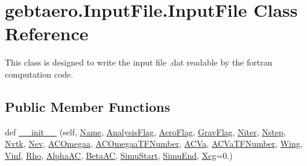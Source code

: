 \hypertarget{classgebtaero_1_1_input_file_1_1_input_file}{}\section{gebtaero.\+Input\+File.\+Input\+File Class Reference}
\label{classgebtaero_1_1_input_file_1_1_input_file}


This class is designed to write the input file .dat readable by the fortran computation code.  


\subsection*{Public Member Functions}
\begin{DoxyCompactItemize}
\item 
def \hyperlink{classgebtaero_1_1_input_file_1_1_input_file_ab2b0171273e5341d432bc98b59208afd}{\+\_\+\+\_\+init\+\_\+\+\_\+} (self, \hyperlink{classgebtaero_1_1_input_file_1_1_input_file_a87afcf626898dba8987e1cee7c4b4ed2}{Name}, \hyperlink{classgebtaero_1_1_input_file_1_1_input_file_a5e345411ff4b135151d46eaa96fd5b82}{Analysis\+Flag}, \hyperlink{classgebtaero_1_1_input_file_1_1_input_file_ad55254b6742bec2601372089bb1f96c4}{Aero\+Flag}, \hyperlink{classgebtaero_1_1_input_file_1_1_input_file_af8b6db9b44fda4dcd69858c0ae6675d2}{Grav\+Flag}, \hyperlink{classgebtaero_1_1_input_file_1_1_input_file_af663735f2e6dc4753c51e27ca4a7cbc6}{Niter}, \hyperlink{classgebtaero_1_1_input_file_1_1_input_file_af000cbafcaa45e8e55ad7e283f3fc10e}{Nstep}, \hyperlink{classgebtaero_1_1_input_file_1_1_input_file_a4cc370b4a5e05b66152449711685c0b8}{Nvtk}, \hyperlink{classgebtaero_1_1_input_file_1_1_input_file_ae7076931e907978fa63e151f549cc8ae}{Nev}, \hyperlink{classgebtaero_1_1_input_file_1_1_input_file_a17d270c516291f04138f9949ae9e6dd3}{A\+C\+Omegaa}, \hyperlink{classgebtaero_1_1_input_file_1_1_input_file_a6163d16b5322a7047dbe227ba5d390e0}{A\+C\+Omegaa\+T\+F\+Number}, \hyperlink{classgebtaero_1_1_input_file_1_1_input_file_af6abd7fc89c0f484e41fe96fc94e72ec}{A\+C\+Va}, \hyperlink{classgebtaero_1_1_input_file_1_1_input_file_adae1dff6c382e115473ad2b915854978}{A\+C\+Va\+T\+F\+Number}, \hyperlink{classgebtaero_1_1_wing_1_1_wing}{Wing}, \hyperlink{classgebtaero_1_1_input_file_1_1_input_file_aa219468b0f01af23063dbf55c5d40e1b}{Vinf}, \hyperlink{classgebtaero_1_1_input_file_1_1_input_file_a71105300fe8cf88253e38529768b998e}{Rho}, \hyperlink{classgebtaero_1_1_input_file_1_1_input_file_a1bf2ed2352dca0749990cccb737fef5a}{Alpha\+AC}, \hyperlink{classgebtaero_1_1_input_file_1_1_input_file_a20868cef3eeb8d6c140d62d2d2252657}{Beta\+AC}, \hyperlink{classgebtaero_1_1_input_file_1_1_input_file_a76efb85d94155e3065ed0139ee3adc5f}{Simu\+Start}, \hyperlink{classgebtaero_1_1_input_file_1_1_input_file_a94164f915c41a24c95ad025f34b7cbcc}{Simu\+End}, \hyperlink{classgebtaero_1_1_input_file_1_1_input_file_a3e49397db5d15285d57c3df5311bf2f8}{Xcg}=0.)

\end{DoxyCompactItemize}
